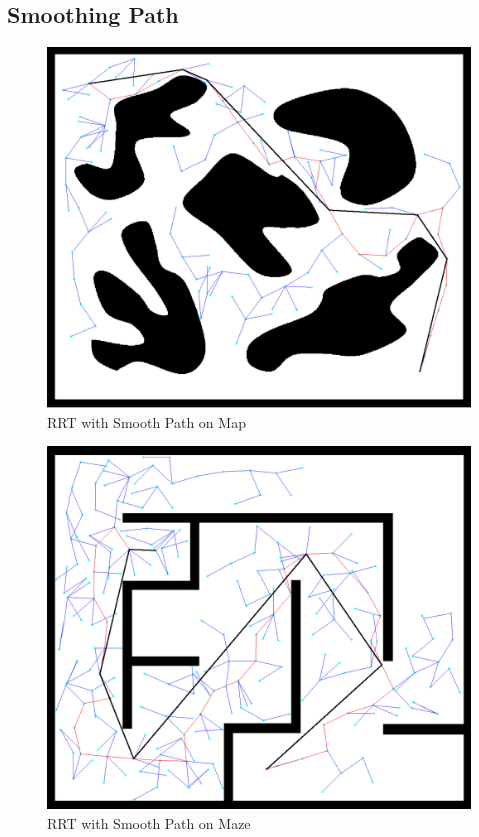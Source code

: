 \documentclass{article}
\begin{document}
	
	\subsection{Smoothing Path}
	
\begin{figure}[H]
\begin{center}
\includegraphics[scale=0.2]{smoothMap.png}
\caption{RRT with Smooth Path on Map}
\end{center}
\end{figure}	

\begin{figure}[H]
\begin{center}
\includegraphics[scale=0.2]{smoothMaze.png}
\caption{RRT with Smooth Path on Maze}
\end{center}
\end{figure}	
	
\end{document}
